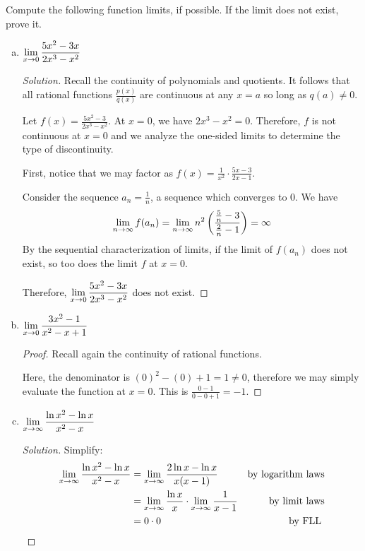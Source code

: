 \question Compute the following function limits, if possible.
If the limit does not exist, prove it.
\begin{enumerate}[(a)]
  \item $\displaystyle\lim_{x\to0} \frac{5x^2-3x}{2x^3-x^2}$
        \begin{proof}[Solution]
          Recall the continuity of polynomials and quotients.
          It follows that all rational functions $\frac{p(x)}{q(x)}$ are continuous at any $x=a$ so long as $q(a)\neq 0$.

          Let $f(x) = \frac{5x^2-3}{2x^3-x^2}$.
          At $x=0$, we have $2x^3-x^2=0$.
          Therefore, $f$ is not continuous at $x=0$ and we analyze the one-sided limits to determine the type of discontinuity.

          First, notice that we may factor as $f(x)=\frac{1}{x^2} \cdot \frac{5x-3}{2x-1}$.

          Consider the sequence $a_n=\frac1n$, a sequence which converges to 0. We have
          \[
            \lim_{n\to\infty} f(a_n)
            = \lim_{n\to\infty} n^2\left(\frac{\frac{5}{n}-3}{\frac{2}{n}-1}\right)
            = \infty
          \]
          By the sequential characterization of limits,
          if the limit of $f(a_n)$ does not exist, so too does the limit $f$ at $x=0$.

          Therefore, $\displaystyle\lim_{x\to0} \frac{5x^2-3x}{2x^3-x^2}$ does not exist.
        \end{proof}
  \item $\displaystyle\lim_{x\to0} \frac{3x^2-1}{x^2-x+1}$
        \begin{proof}
          Recall again the continuity of rational functions.

          Here, the denominator is $(0)^2-(0)+1 = 1 \neq 0$,
          therefore we may simply evaluate the function at $x=0$.
          This is $\frac{0-1}{0-0+1}=-1$.
        \end{proof}
  \item $\displaystyle\lim_{x\to\infty} \frac{\ln x^2 - \ln x}{x^2-x}$
        \begin{proof}[Solution]
          Simplify:
          \begin{align*}
            \lim_{x\to\infty} \frac{\ln x^2 - \ln x}{x^2-x}
             & = \lim_{x\to\infty} \frac{2\ln x - \ln x}{x(x-1)} & \text{by logarithm laws}            \\
             & = \lim_{x\to\infty} \frac{\ln x}{x}\cdot\lim_{x\to\infty} \frac{1}{x-1} & \text{by limit laws}   \\
             & = 0\cdot0                                             & \text{by FLL \qedhere}
          \end{align*}
        \end{proof}
\end{enumerate}

